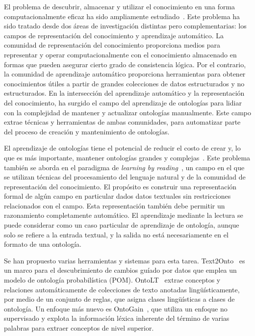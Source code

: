 El problema de descubrir, almacenar y utilizar el conocimiento en una forma computacionalmente eficaz ha sido ampliamente estudiado~\cite{mitchell2015never, ROSPOCHER2016132, cimiano2009ontology}.
Este problema ha sido tratado desde dos áreas de investigación distintas pero complementarias: los campos de representación del conocimiento y aprendizaje automático.
La comunidad de representación del conocimiento proporciona medios para representar y operar computacionalmente con el conocimiento almacenado en formas que pueden asegurar cierto grado de consistencia lógica.
Por el contrario, la comunidad de aprendizaje automático proporciona herramientas para obtener conocimientos útiles a partir de grandes colecciones de datos estructurados y no estructurados.
En la intersección del aprendizaje automático y la representación del conocimiento, ha surgido el campo del aprendizaje de ontologías para lidiar con la complejidad de mantener y actualizar ontologías manualmente.
Este campo extrae técnicas y herramientas de ambas comunidades, para automatizar parte del proceso de creación y mantenimiento de ontologías.

El aprendizaje de ontologías tiene el potencial de reducir el costo de crear y, lo que es más importante, mantener ontologías grandes y complejas~\cite{cimiano2009ontology}.
Este problema también se aborda en el paradigma de \textit{learning by reading}~\cite{barker2007learning}, un campo en el que se utilizan técnicas del procesamiento del lenguaje natural y de la comunidad de representación del conocimiento.
El propósito es construir una representación formal de algún campo en particular dados datos textuales sin restricciones relacionados con el campo.
Esta representación también debe permitir un razonamiento completamente automático. El aprendizaje mediante la lectura se puede considerar como un caso particular de aprendizaje de ontología, aunque solo se refiere a la entrada textual, y la salida no está necesariamente en el formato de una ontología.

Se han propuesto varias herramientas y sistemas para esta tarea.
Text2Onto~\cite{cimiano2005text2onto} es un marco para el descubrimiento de cambios guíado por datos que emplea un modelo de ontología probabilística (POM).
OntoLT~\cite{buitelaar2004ontolt} extrae conceptos y relaciones automáticamente de colecciones de texto anotadas lingüísticamente, por medio de un conjunto de reglas, que asigna clases lingüísticas a clases de ontología.
Un enfoque más nuevo es OntoGain~\cite{drymonas2010unsupervised}, que utiliza un enfoque no supervisado y explota la información léxica inherente del término de varias palabras para extraer conceptos de nivel superior.

